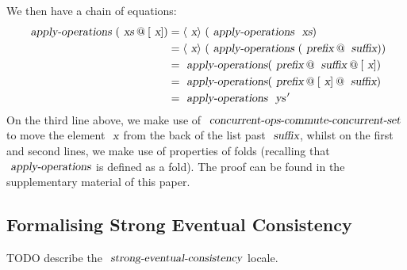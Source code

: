 We then have a chain of equations:
{\small{\begin{align*}
  \isa{apply-operations}\ (\isa{xs} \mathbin{@} [\isa{x}])
  &= \langle\isa{x}\rangle\ (\isa{apply-operations}\ \isa{xs}) \\
  &= \langle\isa{x}\rangle\ (\isa{apply-operations}\ (\isa{prefix} \mathbin{@} \isa{suffix})) \\
  &= \isa{apply-operations} (\isa{prefix} \mathbin{@} \isa{suffix} \mathbin{@} [\isa{x}]) \\
  &= \isa{apply-operations} (\isa{prefix} \mathbin{@} [\isa{x}] \mathbin{@} \isa{suffix}) \\
  &= \isa{apply-operations}\ \isa{ys}{\isacharprime}
\end{align*}}}
On the third line above, we make use of $\isa{concurrent-ops-commute-concurrent-set}$ to move the element $\isa{x}$ from the back of the list past $\isa{suffix}$, whilst on the first and second lines, we make use of properties of folds (recalling that $\isa{apply-operations}$ is defined as a fold).
\else
The proof can be found in the supplementary material of this paper.
\fi

\subsection{Formalising Strong Eventual Consistency}\label{sect.abstract.sec.spec}

TODO describe the $\isa{strong-eventual-consistency}$ locale.
